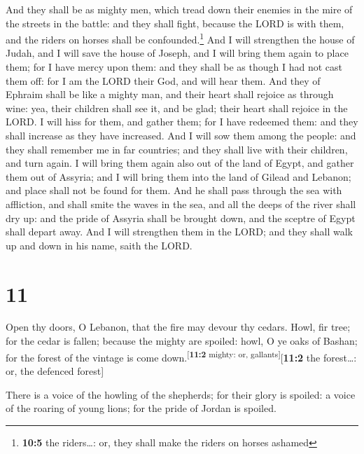 And they shall be as mighty men, which tread down their
enemies in the mire of the streets in the battle: and they shall fight,
because the LORD is with them, and the riders on horses shall be
confounded.\footnote{\textbf{10:5} the riders\ldots: or, they shall make
  the riders on horses ashamed}  And I will strengthen the
house of Judah, and I will save the house of Joseph, and I will bring
them again to place them; for I have mercy upon them: and they shall be
as though I had not cast them off: for I am the LORD their God, and will
hear them.  And they of Ephraim shall be like a mighty
man, and their heart shall rejoice as through wine: yea, their children
shall see it, and be glad; their heart shall rejoice in the LORD.
 I will hiss for them, and gather them; for I have
redeemed them: and they shall increase as they have increased.
 And I will sow them among the people: and they shall
remember me in far countries; and they shall live with their children,
and turn again.  I will bring them again also out of the
land of Egypt, and gather them out of Assyria; and I will bring them
into the land of Gilead and Lebanon; and place shall not be found for
them.  And he shall pass through the sea with affliction,
and shall smite the waves in the sea, and all the deeps of the river
shall dry up: and the pride of Assyria shall be brought down, and the
sceptre of Egypt shall depart away.  And I will
strengthen them in the LORD; and they shall walk up and down in his
name, saith the LORD.

\hypertarget{section-10}{%
\section{11}\label{section-10}}

 Open thy doors, O Lebanon, that the fire may devour thy
cedars.  Howl, fir tree; for the cedar is fallen; because
the mighty are spoiled: howl, O ye oaks of Bashan; for the forest of the
vintage is come down.\textsuperscript{{[}\textbf{11:2} mighty: or,
gallants{]}}{[}\textbf{11:2} the forest\ldots: or, the defenced
forest{]}

 There is a voice of the howling of the shepherds; for
their glory is spoiled: a voice of the roaring of young lions; for the
pride of Jordan is spoiled.


